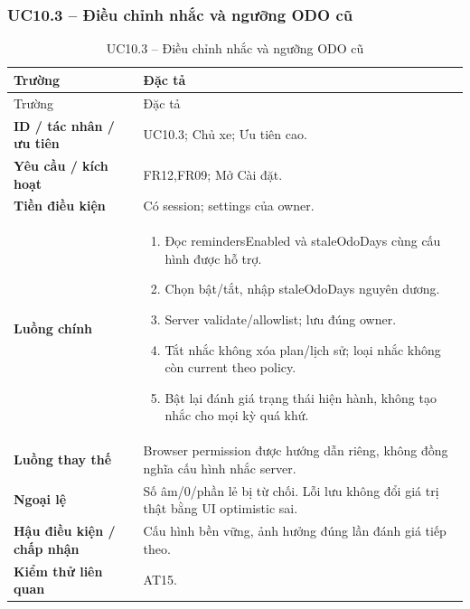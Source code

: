 \subsubsection{UC10.3 -- Điều chỉnh nhắc và ngưỡng ODO cũ}\label{uc:UC10.3}
\begin{smalltable}\begin{longtable}{L{3.2cm}L{11.8cm}}
\caption{UC10.3 -- Điều chỉnh nhắc và ngưỡng ODO cũ}\label{tab:UC10.3}\\
\toprule Trường & Đặc tả\\\midrule\endfirsthead
\toprule Trường & Đặc tả\\\midrule\endhead
\textbf{ID / tác nhân / ưu tiên} & UC10.3; Chủ xe; Ưu tiên cao.\\
\textbf{Yêu cầu / kích hoạt} & FR12,FR09; Mở Cài đặt.\\
\textbf{Tiền điều kiện} & Có session; settings của owner.\\
\textbf{Luồng chính} & \begin{enumerate}[leftmargin=*,nosep]
\item Đọc remindersEnabled và staleOdoDays cùng cấu hình được hỗ trợ.
\item Chọn bật/tắt, nhập staleOdoDays nguyên dương.
\item Server validate/allowlist; lưu đúng owner.
\item Tắt nhắc không xóa plan/lịch sử; loại nhắc không còn current theo policy.
\item Bật lại đánh giá trạng thái hiện hành, không tạo nhắc cho mọi kỳ quá khứ.
\end{enumerate}\\
\textbf{Luồng thay thế} & Browser permission được hướng dẫn riêng, không đồng nghĩa cấu hình nhắc server.\\
\textbf{Ngoại lệ} & Số âm/0/phần lẻ bị từ chối. Lỗi lưu không đổi giá trị thật bằng UI optimistic sai.\\
\textbf{Hậu điều kiện / chấp nhận} & Cấu hình bền vững, ảnh hưởng đúng lần đánh giá tiếp theo.\\
\textbf{Kiểm thử liên quan} & AT15.\\
\bottomrule\end{longtable}\end{smalltable}
